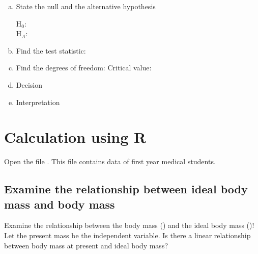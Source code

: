 \begin{enumerate}[a)]
	\item State the null and the alternative hypothesis
	
	H$_0$: 	\hrulefill 	\\
	H$_A$: \hrulefill 	
	
	\item Find the test statistic: \hrulefill
	
	\item Find the degrees of freedom: 	\hrulefill \quad Critical value: \hrulefill 	


	\item		Decision
	
	 \hrulefill 	
	
	\item
Interpretation
	
	 \hrulefill 	
	
	
	\end{enumerate}
	
	
	\vfill\clearpage
	 	
\section{Calculation using R}

Open the file . This file contains data of first year medical students.
\subsection{Examine the relationship between ideal body mass and body mass}
Examine the relationship between the body mass () and the ideal body mass ()! Let the present mass be the independent variable. Is there a linear relationship between body mass at present and ideal body mass?


